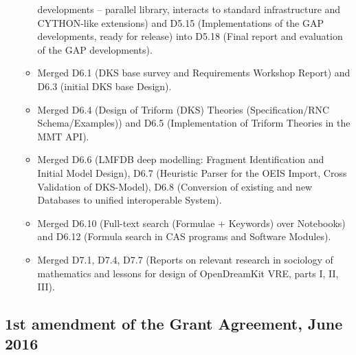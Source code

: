 \documentclass[noworkareas,deliverables,\classoptions]{euproposal}       %
\begin{document}
\begin{proposal}
\begin{enumerate}
\begin{itemize}
    developments – parallel library, interacts to standard
    infrastructure and CYTHON-like extensions) and D5.15
    (Implementations of the GAP developments, ready for release) into
    D5.18 (Final report and evaluation of the GAP developments).
  \item Merged D6.1 (DKS base survey and Requirements Workshop Report)
    and D6.3 (initial DKS base Design).
  \item Merged D6.4 (Design of Triform (DKS) Theories
    (Specification/RNC Schema/Examples)) and D6.5 (Implementation of
    Triform Theories in the MMT API).
  \item Merged D6.6 (LMFDB deep modelling: Fragment Identification and
    Initial Model Design), D6.7 (Heuristic Parser for the OEIS Import,
    Cross Validation of DKS-Model), D6.8 (Conversion of existing and
    new Databases to unified interoperable System).
  \item Merged D6.10 (Full-text search (Formulae + Keywords) over
    Notebooks) and D6.12 (Formula search in CAS programs and Software
    Modules).
  \item Merged D7.1, D7.4, D7.7 (Reports on relevant research in
    sociology of mathematics and lessons for design of OpenDreamKit
    VRE, parts I, II, III).
  \end{itemize}
\end{enumerate}

\clearpage
\subsection*{1st amendment of the Grant Agreement, June 2016}


\end{proposal}
\end{document}
